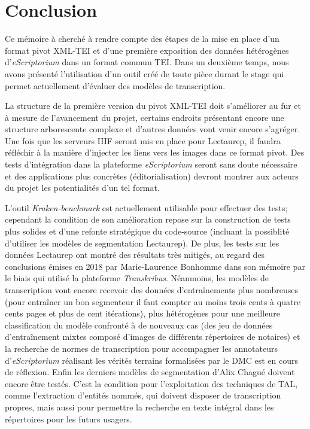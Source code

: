 \part*{Conclusion}


Ce mémoire à cherché à rendre compte des étapes de la mise en place d'un format pivot XML-TEI et d'une première exposition des données hétérogènes d'\textit{eScriptorium} dans un format commun TEI. Dans un deuxième temps, nous avons présenté l'utilisation d'un outil créé de toute pièce durant le stage qui permet actuellement d'évaluer des modèles de transcription.

La structure de la première version du pivot XML-TEI doit s'améliorer au fur et à mesure de l'avancement du projet, certains endroits présentant encore une structure arborescente complexe et d'autres données vont venir encore s'agréger. Une fois que les serveurs IIIF seront mis en place pour Lectaurep, il faudra réfléchir à la manière d'injecter les liens vers les images dans ce format pivot. Des tests d'intégration dans la plateforme \textit{eScriptorium} seront sans doute nécessaire et des applications plus concrètes (éditorialisation) devront montrer aux acteurs du projet les potentialités d'un tel format.

L'outil \textit{Kraken-benchmark} est actuellement utilisable pour effectuer des tests; cependant la condition de son amélioration repose sur la construction de tests plus solides et d'une refonte stratégique du code-source (incluant la possiblité d'utiliser les modèles de segmentation Lectaurep). De plus, les tests sur les données Lectaurep ont montré des résultats très mitigés, au regard des conclusions émises en 2018 par Marie-Laurence Bonhomme dans son mémoire par le biais qui utilisé la plateforme \textit{Transkribus}. Néanmoins, les modèles de transcription vont encore recevoir des données d'entraînements plus nombreuses (pour entraîner un bon segmenteur il faut compter au moins trois cents à quatre cents pages et plus de cent itérations), plus hétérogènes pour une meilleure classification du modèle confronté à de nouveaux cas (des jeu de données d'entraînement mixtes composé d'images de différents répertoires de notaires) et la recherche de normes de transcription pour accompagner les annotateurs d'\textit{eScriptorium} réalisant les vérités terrains formalisées par le DMC est en cours de réflexion. Enfin les derniers modèles de segmentation d'Alix Chagué doivent encore être testés. C'est la condition pour l'exploitation des techniques de TAL, comme l'extraction d'entités nommés, qui doivent disposer de transcription propres, mais aussi pour permettre la recherche en texte intégral dans les répertoires pour les futurs usagers.

